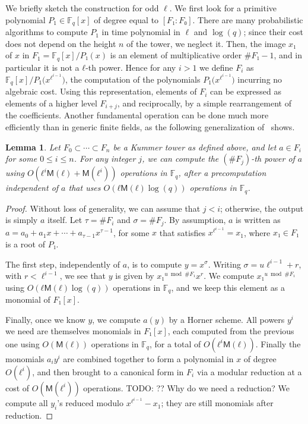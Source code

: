 \documentclass{lms}
\newcommand{\todo}[1]{{\color{red}TODO: #1}}
\newtheorem{lem}[thm]{Lemma}
\def\cout#1{\mathsf{#1}}
\newcommand{\F}{\mathbb{F}}
\newcommand{\MM}{\cout{M}}
\begin{document}
We briefly sketch the construction for odd $\ell$. We first look for a
primitive polynomial $P_1∈\F_q[x]$ of degree equal to $[F₁:F₀]$. There
are many probabilistic algorithms to compute $P_1$ in time polynomial
in $\ell$ and $\log(q)$; since their cost does not depend on the height
$n$ of the tower, we neglect it. Then, the image $x₁$ of $x$ in
$F_1=\F_q[x]/P₁(x)$ is an element of multiplicative order $\#F₁-1$,
and in particular it is not a $ℓ$-th power. Hence for any $i>1$ we
define $F_i$ as $\F_q[x]/P_1\bigl(x^{ℓ^{i-1}}\bigr)$, the computation
of the polynomials $P_1\bigl(x^{ℓ^{i-1}}\bigr)$ incurring no algebraic
cost. Using this representation, elements of $F_i$ can be expressed as
elements of a higher level $F_{i+j}$, and reciprocally, by a simple
rearrangement of the coefficients. Another fundamental operation can
be done much more efficiently than in generic finite fields, as the
following generalization of~\cite[\S2.3]{DoSc12} shows.

\begin{lem}\label{lemma:frob-ell}
  Let $F_0⊂\cdots⊂F_n$ be a Kummer tower as defined above, and let
  $a∈F_i$ for some $0≤i≤n$. For any integer $j$, we can compute the
  $(\#F_j)$-th power of $a$ using $O(ℓ^i\MM(ℓ) + \MM(ℓ^i))$ operations
  in $\F_q$, after a precomputation independent of $a$ that uses
  $O(ℓ\MM(ℓ)\log(q))$ operations in $\F_q$.
\end{lem}
\begin{proof}
  Without loss of generality, we can assume that $j<i$; otherwise, the
  output is simply $a$ itself. Let $τ=\#F_i$ and $σ=\#F_j$. By
  assumption, $a$ is written as
  $a =a_0 + a_1 x + \cdots + a_{τ-1} x^{τ-1}$, for some $x$ that
  satisfies $x^{\ell^{i-1}}=x_1$, where $x₁∈F₁$ is a root of $P₁$.

  The first step, independently of $a$, is to compute $y=x^σ$. Writing
  $σ = u \ell^{i-1} + r$, with $r < \ell^{i-1}$, we see that $y$ is
  given by $x₁^{u \bmod \#F₁}x^r$. We compute $x₁^{u\bmod\#F₁}$ using
  $O(ℓ\MM(ℓ)\log(q))$ operations in $\F_q$, and we keep this element
  as a monomial of $F₁[x]$.

  Finally, once we know $y$, we compute $a(y)$ by a Horner scheme. All
  powers $y^i$ we need are themselves monomials in $F₁[x]$, each
  computed from the previous one using $O(\MM(ℓ))$ operations in
  $\F_q$, for a total of $O(ℓ^i\MM(ℓ))$. Finally the monomials
  $a_iy^i$ are combined together to form a polynomial in $x$ of degree
  $O(ℓ^i)$, and then brought to a canonical form in $F_i$ via a
  modular reduction at a cost of $O(\MM(ℓ^i))$ operations.
  \todo{?? Why do we need a reduction? We compute all $y_i$'s reduced modulo 
    $x^{\ell^{i-1}}-x_1$; they are still monomials after reduction.}
\end{proof}
\end{document}
